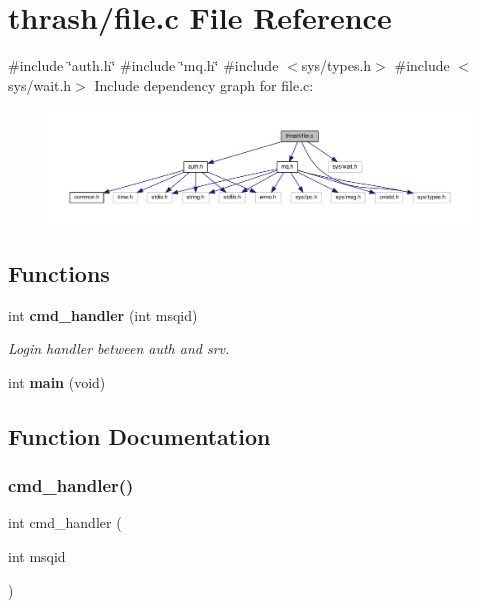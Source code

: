 \section{thrash/file.c File Reference}
\label{file_8c}
{\ttfamily \#include \char`\"{}auth.\+h\char`\"{}}\newline
{\ttfamily \#include \char`\"{}mq.\+h\char`\"{}}\newline
{\ttfamily \#include $<$sys/types.\+h$>$}\newline
{\ttfamily \#include $<$sys/wait.\+h$>$}\newline
Include dependency graph for file.\+c\+:
\nopagebreak
\begin{figure}[H]
\begin{center}
\leavevmode
\includegraphics[width=350pt]{file_8c__incl}
\end{center}
\end{figure}
\subsection*{Functions}
\begin{DoxyCompactItemize}
\item 
int \textbf{ cmd\+\_\+handler} (int msqid)
\begin{DoxyCompactList}\small\item\em Login handler between auth and srv. \end{DoxyCompactList}\item 
int \textbf{ main} (void)
\end{DoxyCompactItemize}


\subsection{Function Documentation}
\mbox{\label{file_8c_a975d9337db509c0204b110f51d723160}} 
\subsubsection{cmd\+\_\+handler()}
{\footnotesize\ttfamily int cmd\+\_\+handler (\begin{DoxyParamCaption}\item[{int}]{msqid }\end{DoxyParamCaption})}



